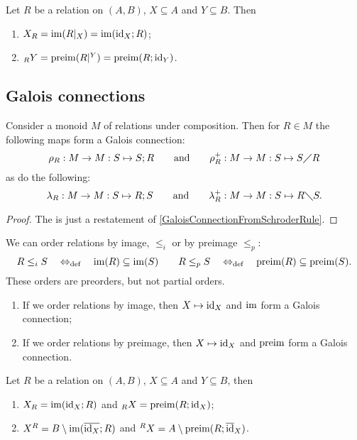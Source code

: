 \begin{lemma}
Let $R$ be a relation on $(A,B)$, $X\subseteq A$ and $Y\subseteq B$. Then
\begin{enumerate}
\item $X_R = \operatorname{im}(R|_X) = \operatorname{im}(\operatorname{id}_X;R)$;
\item $_RY = \operatorname{preim}(R|^Y) = \operatorname{preim}(R;\operatorname{id}_Y)$.
\end{enumerate}
\end{lemma}

\subsection{Galois connections}
\begin{proposition}
Consider a monoid $M$ of relations under composition. Then for $R\in M$ the following maps form a Galois connection:
\[ \rho_R: M\to M: S \mapsto S;R \qquad\text{and}\qquad \rho_R^+: M\to M: S \mapsto S\diagup R \]
as do the following:
\[ \lambda_R: M\to M: S \mapsto R;S \qquad\text{and}\qquad \lambda_R^+: M\to M: S \mapsto R\diagdown S. \]
\end{proposition}
\begin{proof}
The is just a restatement of \ref{GaloisConnectionFromSchroderRule}.
\end{proof}

\begin{proposition}
We can order relations by image, $\leq_i$ or by preimage $\leq_p$:
\[ R \leq_i S \quad\Leftrightarrow_{\text{def}}\quad \operatorname{im}(R) \subseteq \operatorname{im}(S) \qquad R \leq_p S \quad\Leftrightarrow_{\text{def}}\quad \operatorname{preim}(R) \subseteq \operatorname{preim}(S). \]
These orders are preorders, but not partial orders.
\begin{enumerate}
\item If we order relations by image, then $X\mapsto \operatorname{id}_X$ and $\operatorname{im}$ form a Galois connection;
\item If we order relations by preimage, then $X\mapsto \operatorname{id}_X$ and $\operatorname{preim}$ form a Galois connection.
\end{enumerate}
\end{proposition}

\begin{lemma}
Let $R$ be a relation on $(A,B)$, $X\subseteq A$ and $Y\subseteq B$, then
\begin{enumerate}
\item $X_R = \operatorname{im}(\operatorname{id}_X; R)$ and $_RX = \operatorname{preim}(R;\operatorname{id}_X)$;
\item $X^R = B\setminus \operatorname{im}(\overline{\operatorname{id}_X}; R)$ and $^RX = A\setminus \operatorname{preim}(R;\overline{\operatorname{id}}_X)$.
\end{enumerate}
\end{lemma}


